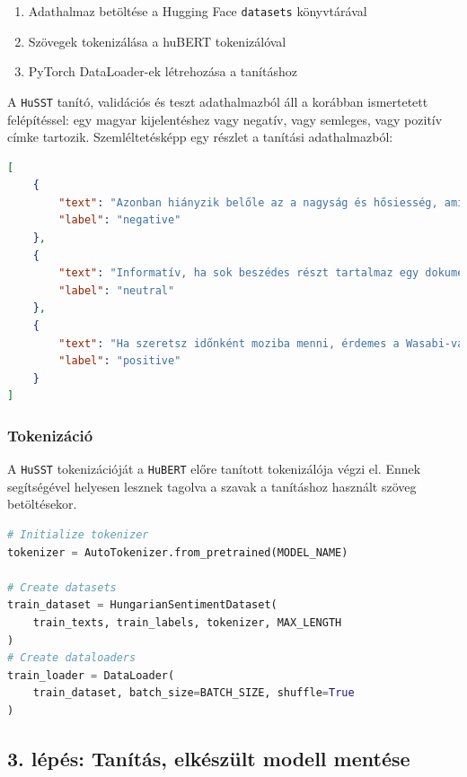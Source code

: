 \documentclass[12pt]{article}
\begin{document}
\begin{enumerate}
    \item Adathalmaz betöltése a Hugging Face \texttt{datasets} könyvtárával
    \item Szövegek tokenizálása a huBERT tokenizálóval
    \item PyTorch DataLoader-ek létrehozása a tanításhoz
\end{enumerate}

A \texttt{HuSST} tanító, validációs és teszt adathalmazból áll a korábban ismertetett felépítéssel: egy magyar kijelentéshez vagy negatív, vagy semleges, vagy pozitív címke tartozik. Szemléltetésképp egy részlet a tanítási adathalmazból:

\begin{lstlisting}[language=json, caption=Minta a HuSST adathalmazból]
[
    {
        "text": "Azonban hiányzik belőle az a nagyság és hősiesség, ami Stevensont és a korábbi Disney-meséket jellemzi.",
        "label": "negative"
    },
    {
        "text": "Informatív, ha sok beszédes részt tartalmaz egy dokumentumfilm.",
        "label": "neutral"
    },
    {
        "text": "Ha szeretsz időnként moziba menni, érdemes a Wasabi-val kezdeni.",
        "label": "positive"
    }
]
\end{lstlisting}

\subsubsection{Tokenizáció}

A \texttt{HuSST} tokenizációját a \texttt{HuBERT} előre tanított tokenizálója végzi el. Ennek segítségével helyesen lesznek tagolva  a szavak a tanításhoz használt szöveg betöltésekor.

\begin{lstlisting}[language=Python,caption=Tokenizáció]
# Initialize tokenizer
tokenizer = AutoTokenizer.from_pretrained(MODEL_NAME)

# Create datasets
train_dataset = HungarianSentimentDataset(
    train_texts, train_labels, tokenizer, MAX_LENGTH
)
# Create dataloaders
train_loader = DataLoader(
    train_dataset, batch_size=BATCH_SIZE, shuffle=True
)
\end{lstlisting}

\subsection{3. lépés: Tanítás, elkészült modell mentése}
\end{document}
